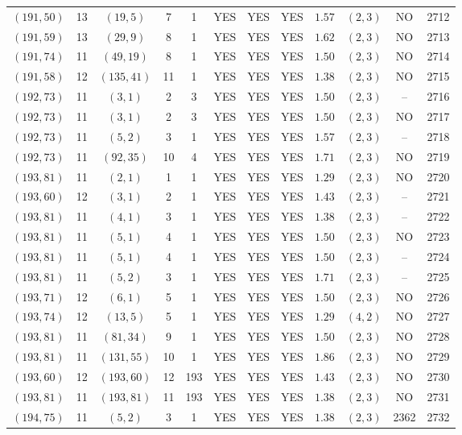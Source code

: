 \begin{longtable}{|c|c|c|c|c|c|c|c|c|c|c|c|}
$(191,50)$ & 13 & $(19,5)$ & 7 & 1 & YES & YES & YES & $1.57$ & $(2,3)$ & NO & 2712\\
$(191,59)$ & 13 & $(29,9)$ & 8 & 1 & YES & YES & YES & $1.62$ & $(2,3)$ & NO & 2713\\
$(191,74)$ & 11 & $(49,19)$ & 8 & 1 & YES & YES & YES & $1.50$ & $(2,3)$ & NO & 2714\\
$(191,58)$ & 12 & $(135,41)$ & 11 & 1 & YES & YES & YES & $1.38$ & $(2,3)$ & NO & 2715\\
$(192,73)$ & 11 & $(3,1)$ & 2 & 3 & YES & YES & YES & $1.50$ & $(2,3)$ & -- & 2716\\
$(192,73)$ & 11 & $(3,1)$ & 2 & 3 & YES & YES & YES & $1.50$ & $(2,3)$ & NO & 2717\\
$(192,73)$ & 11 & $(5,2)$ & 3 & 1 & YES & YES & YES & $1.57$ & $(2,3)$ & -- & 2718\\
$(192,73)$ & 11 & $(92,35)$ & 10 & 4 & YES & YES & YES & $1.71$ & $(2,3)$ & NO & 2719\\
$(193,81)$ & 11 & $(2,1)$ & 1 & 1 & YES & YES & YES & $1.29$ & $(2,3)$ & NO & 2720\\
$(193,60)$ & 12 & $(3,1)$ & 2 & 1 & YES & YES & YES & $1.43$ & $(2,3)$ & -- & 2721\\
$(193,81)$ & 11 & $(4,1)$ & 3 & 1 & YES & YES & YES & $1.38$ & $(2,3)$ & -- & 2722\\
$(193,81)$ & 11 & $(5,1)$ & 4 & 1 & YES & YES & YES & $1.50$ & $(2,3)$ & NO & 2723\\
$(193,81)$ & 11 & $(5,1)$ & 4 & 1 & YES & YES & YES & $1.50$ & $(2,3)$ & -- & 2724\\
$(193,81)$ & 11 & $(5,2)$ & 3 & 1 & YES & YES & YES & $1.71$ & $(2,3)$ & -- & 2725\\
$(193,71)$ & 12 & $(6,1)$ & 5 & 1 & YES & YES & YES & $1.50$ & $(2,3)$ & NO & 2726\\
$(193,74)$ & 12 & $(13,5)$ & 5 & 1 & YES & YES & YES & $1.29$ & $(4,2)$ & NO & 2727\\
$(193,81)$ & 11 & $(81,34)$ & 9 & 1 & YES & YES & YES & $1.50$ & $(2,3)$ & NO & 2728\\
$(193,81)$ & 11 & $(131,55)$ & 10 & 1 & YES & YES & YES & $1.86$ & $(2,3)$ & NO & 2729\\
$(193,60)$ & 12 & $(193,60)$ & 12 & 193 & YES & YES & YES & $1.43$ & $(2,3)$ & NO & 2730\\
$(193,81)$ & 11 & $(193,81)$ & 11 & 193 & YES & YES & YES & $1.38$ & $(2,3)$ & NO & 2731\\
$(194,75)$ & 11 & $(5,2)$ & 3 & 1 & YES & YES & YES & $1.38$ & $(2,3)$ & 2362 & 2732\\

\end{longtable}
